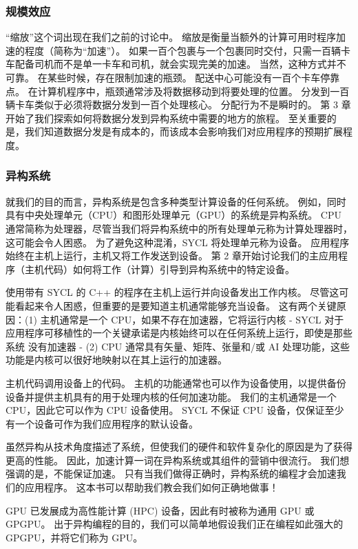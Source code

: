 \subsubsection{规模效应}
“缩放”这个词出现在我们之前的讨论中。 缩放是衡量当额外的计算可用时程序加速的程度（简称为“加速”）。 如果一百个包裹与一个包裹同时交付，只需一百辆卡车配备司机而不是单一卡车和司机，就会实现完美的加速。 当然，这种方式并不可靠。 在某些时候，存在限制加速的瓶颈。 配送中心可能没有一百个卡车停靠点。 在计算机程序中，瓶颈通常涉及将数据移动到将要处理的位置。 分发到一百辆卡车类似于必须将数据分发到一百个处理核心。 分配行为不是瞬时的。 第 3 章开始了我们探索如何将数据分发到异构系统中需要的地方的旅程。 至关重要的是，我们知道数据分发是有成本的，而该成本会影响我们对应用程序的预期扩展程度。

\subsubsection{异构系统}
就我们的目的而言，异构系统是包含多种类型计算设备的任何系统。 例如，同时具有中央处理单元（CPU）和图形处理单元（GPU）的系统是异构系统。 CPU 通常简称为处理器，尽管当我们将异构系统中的所有处理单元称为计算处理器时，这可能会令人困惑。 为了避免这种混淆，SYCL 将处理单元称为设备。 应用程序始终在主机上运行，主机又将工作发送到设备。 第 2 章开始讨论我们的主应用程序（主机代码）如何将工作（计算）引导到异构系统中的特定设备。

使用带有 SYCL 的 C++ 的程序在主机上运行并向设备发出工作内核。 尽管这可能看起来令人困惑，但重要的是要知道主机通常能够充当设备。 这有两个关键原因：(1) 主机通常是一个 CPU，如果不存在加速器，它将运行内核 - SYCL 对于应用程序可移植性的一个关键承诺是内核始终可以在任何系统上运行，即使是那些系统 没有加速器 - (2) CPU 通常具有矢量、矩阵、张量和/或 AI 处理功能，这些功能是内核可以很好地映射以在其上运行的加速器。

\begin{remark}
	主机代码调用设备上的代码。 主机的功能通常也可以作为设备使用，以提供备份设备并提供主机具有的用于处理内核的任何加速功能。 我们的主机通常是一个 CPU，因此它可以作为 CPU 设备使用。 SYCL 不保证 CPU 设备，仅保证至少有一个设备可作为我们应用程序的默认设备。
\end{remark}

虽然异构从技术角度描述了系统，但使我们的硬件和软件复杂化的原因是为了获得更高的性能。 因此，加速计算一词在异构系统或其组件的营销中很流行。 我们想强调的是，不能保证加速。 只有当我们做得正确时，异构系统的编程才会加速我们的应用程序。 这本书可以帮助我们教会我们如何正确地做事！

GPU 已发展成为高性能计算 (HPC) 设备，因此有时被称为通用 GPU 或 GPGPU。 出于异构编程的目的，我们可以简单地假设我们正在编程如此强大的 GPGPU，并将它们称为 GPU。

